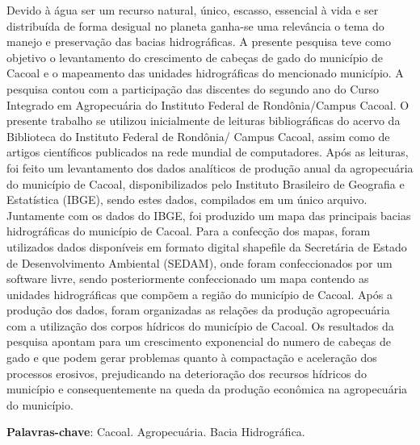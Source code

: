 \documentclass[article,12pt,onesidea,4paper,english,brazil]{abntex2}
\begin{document}
	\noindent Devido à água ser um recurso natural, único, escasso, essencial à vida e ser distribuída de forma desigual no planeta ganha-se uma relevância o tema do manejo e preservação das bacias hidrográficas. A presente pesquisa teve como objetivo o levantamento do crescimento de cabeças de gado do município de Cacoal e o mapeamento das unidades hidrográficas do mencionado município. A pesquisa contou com a participação das discentes do segundo ano do Curso Integrado em Agropecuária do Instituto Federal de Rondônia/Campus Cacoal. O presente trabalho se utilizou inicialmente de leituras bibliográficas do acervo da Biblioteca do Instituto Federal de Rondônia/ Campus Cacoal, assim como de artigos científicos publicados na rede mundial de computadores. Após as leituras, foi feito um levantamento dos dados analíticos de produção anual da agropecuária do município de Cacoal, disponibilizados pelo Instituto Brasileiro de Geografia e Estatística (IBGE), sendo estes dados, compilados em um único arquivo. Juntamente com os dados do IBGE, foi produzido um mapa das principais bacias hidrográficas do município de Cacoal. Para a confecção dos mapas, foram utilizados dados disponíveis em formato digital shapefile da Secretária de Estado de Desenvolvimento Ambiental (SEDAM), onde foram confeccionados por um software livre, sendo posteriormente confeccionado um mapa contendo as unidades hidrográficas que compõem a região do município de Cacoal. Após a produção dos dados, foram organizadas as relações da produção agropecuária com a utilização dos corpos hídricos do município de Cacoal. Os resultados da pesquisa apontam para um crescimento exponencial do numero de cabeças de gado e que podem gerar problemas quanto à compactação e aceleração dos processos erosivos, prejudicando na deterioração dos recursos hídricos do município e consequentemente na queda da produção econômica na agropecuária do município.
	
	\vspace{\onelineskip}
	
	\noindent
	\textbf{Palavras-chave}: Cacoal. Agropecuária. Bacia Hidrográfica.
	
\end{document}
